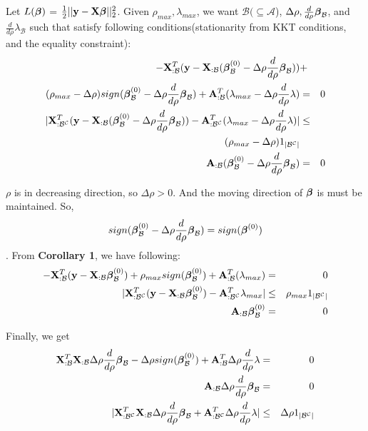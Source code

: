 \documentclass{article}
\newcommand{\bA}{{\bf A}}
\newcommand{\by}{{\bf y}}
\newcommand{\bX}{{\bf X}}
\newcommand{\bbeta}{\mbox{\boldmath{$\beta$}}}
\newcommand{\bea}{\begin{eqnarray}}
\newcommand{\eea}{\end{eqnarray}}
\begin{document}
\bigskip
Let $L(\bbeta)$ = $\frac{1}{2} ||\by - \bX \bbeta||_2^2$. Given $\rho_{max}, \lambda_{max}$, we want $\mathcal{B} (\subseteq \mathcal{A}$), $\Delta \rho, \frac{d}{d\rho}\bbeta_{\mathcal{B}}$, and $\frac{d}{d\rho}\lambda_{\mathcal{B}}$ such that satisfy following conditions(stationarity from KKT conditions, and the equality constraint):
\bea
-\bX_{:\mathcal{B}}^T (\by - \bX_{:\mathcal{B}}(\bbeta_{\mathcal{B}}^{(0)} - \Delta \rho \frac{d}{d\rho}\bbeta_{\mathcal{B}})) &+& \nonumber \\
(\rho_{max} - \Delta \rho) sign(\bbeta_{\mathcal{B}}^{(0)} - \Delta \rho \frac{d}{d\rho}\bbeta_{\mathcal{B}}) + \bA_{:\mathcal{B}}^T (\lambda_{max} - \Delta \rho \frac{d}{d\rho}\lambda) &=& 0 \\
\lvert \bX_{:\mathcal{B^C}}^T (\by - \bX_{:\mathcal{B}}(\bbeta_{\mathcal{B}}^{(0)} - \Delta \rho \frac{d}{d\rho}\bbeta_{\mathcal{B}})) - \bA_{:\mathcal{B^C}}^T (\lambda_{max} - \Delta \rho \frac{d}{d\rho}\lambda) \rvert &\leq& \nonumber \\
(\rho_{max} - \Delta \rho) 1_{|\mathcal{B^C}|}&& \\ 
\bA_{:\mathcal{B}}(\bbeta_{\mathcal{B}}^{(0)} - \Delta \rho \frac{d}{d\rho}\bbeta_{\mathcal{B}}) &=& 0 
\eea

$\rho$ is in decreasing direction, so $\Delta \rho > 0$. 
And the moving direction of $\bbeta$ is must be maintained.
So, $$sign(\bbeta_{\mathcal{B}}^{(0)} - \Delta \rho \frac{d}{d\rho}\bbeta_{\mathcal{B}}) = sign(\bbeta^{(0)})$$.
From \textbf{Corollary 1}, we have following:
\bea
-\bX_{:\mathcal{B}}^T (\by - \bX_{:\mathcal{B}}\bbeta_{\mathcal{B}}^{(0)}) + \rho_{max} sign(\bbeta_{\mathcal{B}}^{(0)}) + \bA_{:\mathcal{B}}^T (\lambda_{max}) &=& 0 \\
\lvert \bX_{:\mathcal{B^C}}^T (\by - \bX_{:\mathcal{B}}\bbeta_{\mathcal{B}}^{(0)}) - \bA_{:\mathcal{B^C}}^T \lambda_{max} \rvert &\leq& \rho_{max} 1_{|\mathcal{B^C}|} \\
\bA_{:\mathcal{B}}\bbeta_{\mathcal{B}}^{(0)} &=& 0 
\eea

Finally, we get
\bea
\bX_{:\mathcal{B}}^T\bX_{:\mathcal{B}} \Delta \rho \frac{d}{d\rho}\bbeta_{\mathcal{B}} - \Delta \rho sign(\bbeta_{\mathcal{B}}^{(0)}) + \bA_{:\mathcal{B}}^T \Delta \rho \frac{d}{d\rho}\lambda &=& 0 \\
 \bA_{:\mathcal{B}} \Delta \rho \frac{d}{d\rho}\bbeta_{\mathcal{B}} &=& 0 \\
\lvert \bX_{:\mathcal{B^C}}^T \bX_{:\mathcal{B}} \Delta \rho \frac{d}{d\rho}\bbeta_{\mathcal{B}} + \bA_{:\mathcal{B^C}}^T \Delta \rho \frac{d}{d\rho}\lambda \rvert &\leq& \Delta \rho 1_{|\mathcal{B^C}|} 
\eea
\end{document}
